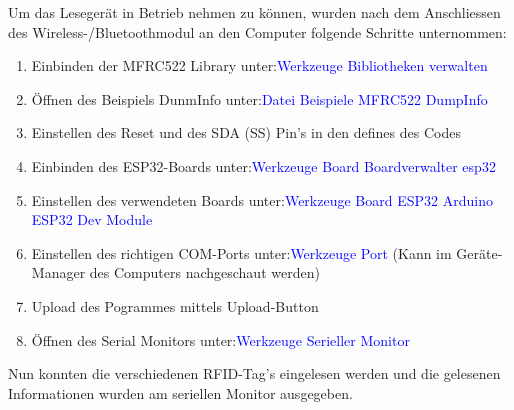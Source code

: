 Um das Lesegerät in Betrieb nehmen zu können, wurden nach dem Anschliessen des Wireless-/Bluetoothmodul an den Computer folgende Schritte unternommen: 

\begin{enumerate}
\item Einbinden der MFRC522 Library unter:\newline\textcolor{blue}{Werkzeuge \textrightarrow Bibliotheken verwalten} \newline
\item Öffnen des Beispiels DunmInfo unter:\newline\textcolor{blue}{Datei \textrightarrow Beispiele \textrightarrow MFRC522 \textrightarrow DumpInfo} \newline
\item Einstellen des Reset und des SDA (SS) Pin's in den defines des Codes\newline
\item Einbinden des ESP32-Boards unter:\newline\textcolor{blue}{Werkzeuge \textrightarrow Board \textrightarrow Boardverwalter \textrightarrow esp32} \newline
\item Einstellen des verwendeten Boards unter:\newline\textcolor{blue}{Werkzeuge \textrightarrow Board \textrightarrow ESP32 Arduino \textrightarrow ESP32 Dev Module} \newline
\item Einstellen des richtigen COM-Ports unter:\newline\textcolor{blue}{Werkzeuge \textrightarrow Port} (Kann im Geräte-Manager des Computers nachgeschaut werden) \newline
\item Upload des Pogrammes mittels Upload-Button \newline
\item Öffnen des Serial Monitors unter:\newline\textcolor{blue}{Werkzeuge \textrightarrow  Serieller Monitor} \newline
\end{enumerate}

Nun konnten die verschiedenen RFID-Tag's eingelesen werden und  die gelesenen Informationen wurden am seriellen Monitor ausgegeben. \cite{pcbreflux_esp32_2017}